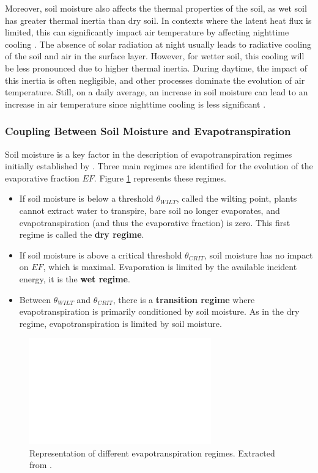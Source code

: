 Moreover, soil moisture also affects the thermal properties of the soil, as wet soil has greater thermal inertia than dry soil. In contexts where the latent heat flux is limited, this can significantly impact air temperature by affecting nighttime cooling \citep{ait-mesbah_role_2015}. The absence of solar radiation at night usually leads to radiative cooling of the soil and air in the surface layer. However, for wetter soil, this cooling will be less pronounced due to higher thermal inertia. During daytime, the impact of this inertia is often negligible, and other processes dominate the evolution of air temperature. Still, on a daily average, an increase in soil moisture can lead to an increase in air temperature since nighttime cooling is less significant \citep{cheruy_role_2017}.

\subsubsection*{Coupling Between Soil Moisture and Evapotranspiration}

Soil moisture is a key factor in the description of evapotranspiration regimes initially established by \cite{Budyko_1956, Budyko_1974}. Three main regimes are identified for the evolution of the evaporative fraction $EF$. Figure \ref{fig:evap_regimes} represents these regimes.

\begin{itemize}
    \item If soil moisture is below a threshold $\theta_{WILT}$, called the wilting point, plants cannot extract water to transpire, bare soil no longer evaporates, and evapotranspiration (and thus the evaporative fraction) is zero. This first regime is called the \textbf{dry regime}.
    \item If soil moisture is above a critical threshold $\theta_{CRIT}$, soil moisture has no impact on $EF$, which is maximal. Evaporation is limited by the available incident energy, it is the \textbf{wet regime}.
    \item Between $\theta_{WILT}$ and $\theta_{CRIT}$, there is a \textbf{transition regime} where evapotranspiration is primarily conditioned by soil moisture. As in the dry regime, evapotranspiration is limited by soil moisture.
\end{itemize}

\begin{figure}[ht]
    \centering
    \includegraphics[width=0.7\textwidth]{images/evap_regimes.png}
    \caption{Representation of different evapotranspiration regimes. Extracted from \cite{seneviratne_investigating_2010}.}
    \label{fig:evap_regimes}
\end{figure}

